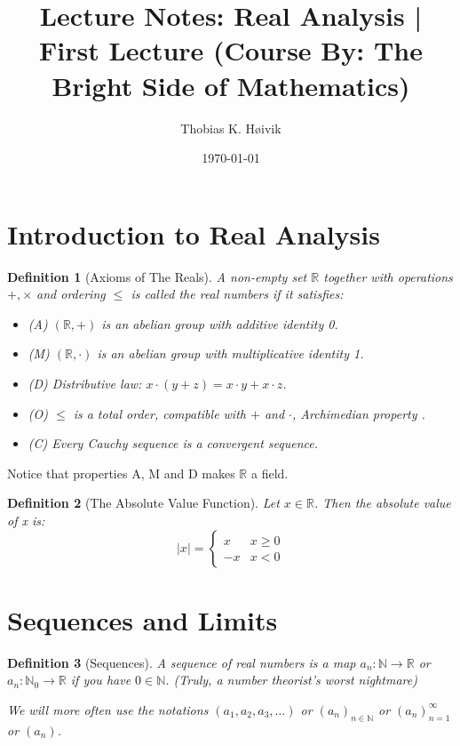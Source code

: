 \documentclass[12pt]{article}
\title{Lecture Notes: Real Analysis | First Lecture (Course By: The Bright Side of Mathematics) }
\author{Thobias K. Høivik}
\date{\today}
\newtheorem{definition}{Definition}
\begin{document}
\maketitle
\section*{Introduction to Real Analysis}
\begin{definition}[Axioms of The Reals]

    A non-empty set \(\mathbb R\) together with operations 
    \(+,\times\) and ordering \(\leq\) is called 
    the real numbers if it satisfies: 
    \begin{itemize}
        \item (A) \((\mathbb R, +)\) is an abelian group with additive identity 0.
        \item (M) \((\mathbb R, \cdot)\) is an abelian group with multiplicative identity 1.
        \item (D) Distributive law: \(x \cdot (y+z) = x\cdot y + x\cdot z\).
        \item (O) \(\leq\) is a total order, compatible with \(+\) and \(\cdot\),
            Archimedian property .
        \item (C) Every Cauchy sequence is a convergent sequence.
\end{itemize}
\end{definition}

\noindent 
Notice that properties A, M and D makes \(\mathbb R\) a field.

\begin{definition}[The Absolute Value Function]
    Let \(x \in \mathbb R\). Then the absolute value of x is: 
    \[ 
        |x| = 
        \begin{cases}
            x  & x\geq 0 \\
            -x & x < 0
        \end{cases}
    \] 
\end{definition}

\section*{Sequences and Limits} 
\begin{definition}[Sequences]
    A sequence of real numbers is a map 
    \(a_n: \mathbb N \to \mathbb R\) 
    or \(a_n: \mathbb N_0 \to \mathbb R\) if you have \(0 \in \mathbb N\). 
    (Truly, a number theorist's worst nightmare)

    \noindent 
    We will more often use the notations \((a_1, a_2, a_3, \dots)\) or 
    \((a_n)_{n\in \mathbb N}\) or \((a_n)_{n=1}^\infty\) or \((a_n)\).
\end{definition}
\end{document}
